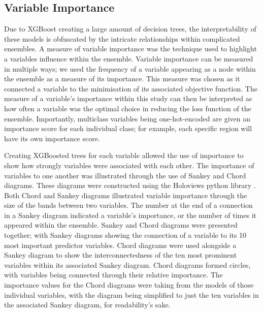 \documentclass[review,12pt,authoryear]{elsarticle}
\begin{document}
\begin{linenumbers}
\subsection{Variable Importance}\label{sec:importance}

Due to XGBoost creating a large amount of decision trees, the interpretability of these models is obfuscated by the intricate relationships within complicated ensembles. A measure of variable importance was the technique used to highlight a variables influence within the ensemble. Variable importance can be measured in multiple ways; we used the frequency of a variable appearing as a node within the ensemble as a measure of its importance. This measure was chosen as it connected a variable to the minimisation of its associated objective function. The measure of a variable's importance within this study can then be interpreted as how often a variable was the optimal choice in reducing the loss function of the ensemble. Importantly, multiclass variables being one-hot-encoded are given an importance score for each individual class; for example, each specific region will have its own importance score.
\par
Creating XGBoosted trees for each variable allowed the use of importance to show how strongly variables were associated with each other. The importance of variables to one another was illustrated through the use of Sankey and Chord diagrams. These diagrams were constructed using the Holoviews python library \citep{philipp_rudiger_2020_3904606}. Both Chord and Sankey diagrams illustrated variable importance through the size of the bands between two variables. The number at the end of a connection in a Sankey diagram indicated a variable's importance, or the number of times it appeared within the ensemble. Sankey and Chord  diagrams were presented together; with Sankey diagrams showing the connection of a variable to its 10 most important predictor variables. Chord diagrams were used alongside a Sankey diagram to show the interconnectedness of the ten most prominent variables within its associated Sankey diagram. Chord diagrams formed circles, with variables being connected through their relative importance. The importance values for the Chord diagrams were taking from the models of those individual variables, with the diagram being simplified to just the ten variables in the associated Sankey diagram, for readability's sake.

\end{linenumbers}
\end{document}
